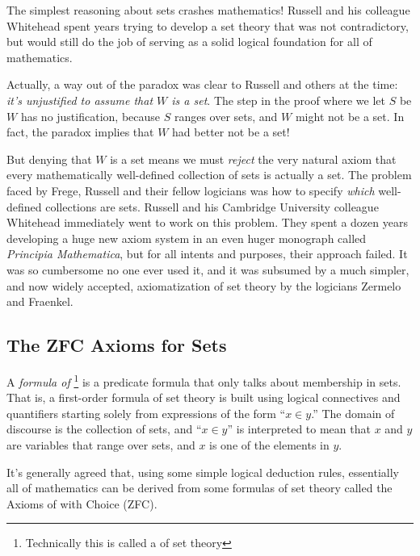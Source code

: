 The simplest reasoning about sets crashes mathematics!  Russell and his
colleague Whitehead spent years trying to develop a set theory that was
not contradictory, but would still do the job of serving as a solid
logical foundation for all of mathematics.

Actually, a way out of the paradox was clear to Russell and others at
the time: \emph{it's unjustified to assume that $W$ is a set}.  The
step in the proof where we let $S$ be $W$ has no justification,
because $S$ ranges over sets, and $W$ might not be a set.  In fact, the
paradox implies that $W$ had better not be a set!

But denying that $W$ is a set means we must \emph{reject} the very
natural axiom that every mathematically well-defined collection of
sets is actually a set.  The problem faced by Frege, Russell and their
fellow logicians was how to specify \emph{which} well-defined
collections are sets.  Russell and his Cambridge University colleague
Whitehead immediately went to work on this problem.  They spent a
dozen years developing a huge new axiom system in an even huger
monograph called \emph{Principia Mathematica}, but for all intents and
purposes, their approach failed.  It was so cumbersome no one ever
used it, and it was subsumed by a much simpler, and now widely
accepted, axiomatization of set theory by the logicians Zermelo
and Fraenkel.

\subsection{The ZFC Axioms for Sets}\label{ZFC_sec}

A \emph{formula of }\footnote{Technically this is
  called a  of set theory} is a predicate
formula that only talks about membership in sets.  That is, a
first-order formula of set theory is built using logical connectives
and quantifiers starting solely from expressions of the form ``$x\in
y$.''  The domain of discourse is the collection of sets, and ``$x \in
y$'' is interpreted to mean that $x$ and $y$ are variables that range
over sets, and $x$ is one of the elements in $y$.

It's generally agreed that, using some simple logical deduction rules,
essentially all of mathematics can be derived from some formulas of
set theory called the Axioms of  with Choice (ZFC).%
%

